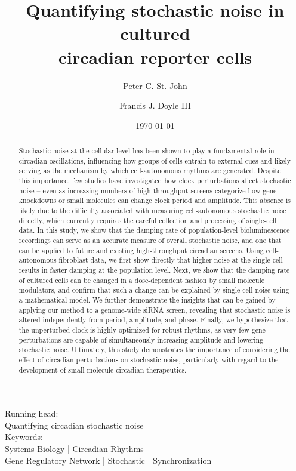 \documentclass[11pt, letterpaper]{article}
\begin{document}
\title{Quantifying stochastic noise in cultured\\ circadian reporter cells}
\author[1]{Peter C. St. John}
\author[1,*]{Francis J. Doyle III}
\date{\today}
\maketitle

\begin{center}
Running head:\\ {Quantifying circadian stochastic noise} \\[1ex]
Keywords:\\ Systems Biology | Circadian Rhythms \\ Gene
Regulatory Network | Stochastic | Synchronization
\end{center}

\pagebreak
\begin{abstract}
Stochastic noise at the cellular level has been shown to play a fundamental role in circadian oscillations, influencing how groups of cells entrain to external cues and likely serving as the mechanism by which cell-autonomous rhythms are generated.
Despite this importance, few studies have investigated how clock perturbations affect stochastic noise -- even as increasing numbers of high-throughput screens categorize how gene knockdowns or small molecules can change clock period and amplitude.
This absence is likely due to the difficulty associated with measuring cell-autonomous stochastic noise directly, which currently requires the careful collection and processing of single-cell data.
In this study, we show that the damping rate of population-level bioluminescence recordings can serve as an accurate measure of overall stochastic noise, and one that can be applied to future and existing high-throughput circadian screens.
Using cell-autonomous fibroblast data, we first show directly that higher noise at the single-cell results in faster damping at the population level.
Next, we show that the damping rate of cultured cells can be changed in a dose-dependent fashion by small molecule modulators, and confirm that such a change can be explained by single-cell noise using a mathematical model.
We further demonstrate the insights that can be gained by applying our method to a genome-wide siRNA screen, revealing that stochastic noise is altered independently from period, amplitude, and phase.
Finally, we hypothesize that the unperturbed clock is highly optimized for robust rhythms, as very few gene perturbations are capable of simultaneously increasing amplitude and lowering stochastic noise.
Ultimately, this study demonstrates the importance of considering the effect of circadian perturbations on stochastic noise, particularly with regard to the development of small-molecule circadian therapeutics.
\end{abstract}
\end{document}
